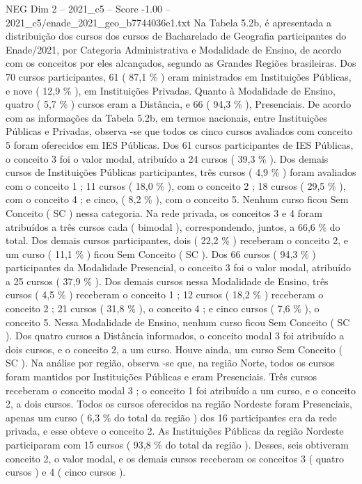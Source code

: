 \begin{textsample}{NEG Dim 2 – 2021\_c5 – Score -1.00 – 2021\_c5/enade\_2021\_geo\_b7744036e1.txt}
Na Tabela 5.2b, é apresentada a distribuição dos cursos dos cursos de Bacharelado de Geografia participantes do Enade/2021, por Categoria Administrativa e Modalidade de Ensino, de acordo com os conceitos por eles alcançados, segundo as Grandes Regiões brasileiras.
Dos 70 cursos participantes, 61 ( 87,1 \% ) eram ministrados em Instituições Públicas, e nove ( 12,9 \% ), em Instituições Privadas.
Quanto à Modalidade de Ensino, quatro ( 5,7 \% ) cursos eram a Distância, e 66 ( 94,3 \% ), Presenciais.
De acordo com as informações da Tabela 5.2b, em termos nacionais, entre Instituições Públicas e Privadas, observa -se que todos os cinco cursos avaliados com conceito 5 foram oferecidos em IES Públicas.
Dos 61 cursos participantes de IES Públicas, o conceito 3 foi o valor modal, atribuído a 24 cursos ( 39,3 \% ).
Dos demais cursos de Instituições Públicas participantes, três cursos ( 4,9 \% ) foram avaliados com o conceito 1 ; 11 cursos ( 18,0 \% ), com o conceito 2 ; 18 cursos ( 29,5 \% ), com o conceito 4 ; e cinco, ( 8,2 \% ), com o conceito 5.
Nenhum curso ficou Sem Conceito ( SC ) nessa categoria.
Na rede privada, os conceitos 3 e 4 foram atribuídos a três cursos cada ( bimodal ), correspondendo, juntos, a 66,6 \% do total.
Dos demais cursos participantes, dois ( 22,2 \% ) receberam o conceito 2, e um curso ( 11,1 \% ) ficou Sem Conceito ( SC ).
Dos 66 cursos ( 94,3 \% ) participantes da Modalidade Presencial, o conceito 3 foi o valor modal, atribuído a 25 cursos ( 37,9 \% ).
Dos demais cursos nessa Modalidade de Ensino, três cursos ( 4,5 \% ) receberam o conceito 1 ; 12 cursos ( 18,2 \% ) receberam o conceito 2 ; 21 cursos ( 31,8 \% ), o conceito 4 ; e cinco cursos ( 7,6 \% ), o conceito 5.
Nessa Modalidade de Ensino, nenhum curso ficou Sem Conceito ( SC ).
Dos quatro cursos a Distância informados, o conceito modal 3 foi atribuído a dois cursos, e o conceito 2, a um curso.
Houve ainda, um curso Sem Conceito ( SC ).
Na análise por região, observa -se que, na região Norte, todos os cursos foram mantidos por Instituições Públicas e eram Presenciais.
Três cursos receberam o conceito modal 3 ; o conceito 1 foi atribuído a um curso, e o conceito 2, a dois cursos.
Todos os cursos oferecidos na região Nordeste foram Presenciais, apenas um curso ( 6,3 \% do total da região ) dos 16 participantes era da rede privada, e esse obteve o conceito 2.
As Instituições Públicas da região Nordeste participaram com 15 cursos ( 93,8 \% do total da região ).
Desses, seis obtiveram conceito 2, o valor modal, e os demais cursos receberam os conceitos 3 ( quatro cursos ) e 4 ( cinco cursos ).

\end{textsample}
